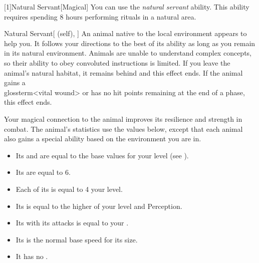         [1]{Natural Servant}[Magical]
        You can use the \textit{natural servant} ability.
        This ability requires spending 8 hours performing rituals in a natural area.
        \begin{attuneability}{Natural Servant}[ (self), ]
            An animal native to the local environment appears to help you.
            It follows your directions to the best of its ability as long as you remain in its natural environment.
            Animals are unable to understand complex concepts, so their ability to obey convoluted instructions is limited.
            If you leave the animal's natural habitat, it remains behind and this effect ends.
            If the animal gains a \\glossterm<vital wound> or has no hit points remaining at the end of a phase, this effect ends.

            Your magical connection to the animal improves its resilience and strength in combat.
            The animal's statistics use the values below, except that each animal also gains a special ability based on the environment you are in.
            \begin{itemize}
                \item Its  and  are equal to the base values for your level (see ).
                \item Its  are equal to 6.
                \item Each of its  is equal to 4 \add your level.
                \item Its  is equal to the higher of your level and Perception.
                \item Its  with its attacks is equal to your .
                \item Its  is the normal base speed for its size.
                \item It has no .
            \end{itemize}
        \end{attuneability}

